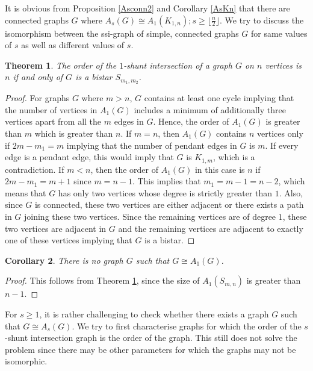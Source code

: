 \documentclass[12pt,a4paper,twoside]{article}
\newtheorem{theorem}{Theorem}[section]
\newtheorem{corollary}[theorem]{Corollary}
\theoremstyle{casesty}
\theoremstyle{subcasesty}
\theoremstyle{schemesty}
\begin{document}
It is obvious from Proposition \ref{Asconn2} and Corollary \ref{AsKn} that there are connected graphs $G$ where $A_{s}(G) \cong A_{1}(K_{1,n}); s \geq \lfloor \frac{n}{2} \rfloor$. We try to discuss the isomorphism between the ssi-graph of simple, connected graphs $G$ for same values of $s$ as well as different values of $s$.

\begin{theorem} \label{A1iso}
	The order of the $1$-shunt intersection of a graph $G$ on $n$ vertices is $n$ if and only of $G$ is a bistar $S_{m_{1},m_{2}}$. 
\end{theorem}
\begin{proof}
	For graphs $G$ where $m>n$, $G$ contains at least one cycle implying that the number of vertices in $A_{1}(G)$ includes a minimum of additionally three vertices apart from all the $m$ edges in $G$. Hence, the order of $A_{1}(G)$ is greater than $m$ which is greater than $n$. If $m=n$, then $A_{1}(G)$ contains $n$ vertices only if $2m-m_{1}=m$ implying that the number of pendant edges in $G$ is $m$. If every edge is a pendant edge, this would imply that $G$ is $K_{1,m}$, which is a contradiction. If $m<n$, then the order of $A_{1}(G)$ in this case is $n$ if $2m-m_{1}=m+1$ since $m=n-1$. This implies that $m_{1}=m-1=n-2$, which means that $G$ has only two vertices whose degree is strictly greater than $1$. Also, since $G$ is connected, these two vertices are either adjacent or there exists a path in $G$ joining these two vertices. Since the remaining vertices are of degree $1$, these two vertices are adjacent in $G$ and the remaining vertices are adjacent to exactly one of these vertices implying that $G$ is a bistar.
\end{proof}

\begin{corollary}
	There is no graph $G$ such that $G \cong A_{1}(G)$.
\end{corollary}
\begin{proof}
	This follows from Theorem \ref{A1iso}, since the size of $A_{1}(S_{m,n})$ is greater than $n-1$.
\end{proof}

For $s \geq 1$, it is rather challenging to check whether there exists a graph $G$ such that $G \cong A_{s}(G)$. We try to first characterise graphs for which the order of the $s$-shunt intersection graph is the order of the graph. This still does not solve the problem since there may be other parameters for which the graphs may not be isomorphic.
\end{document}
